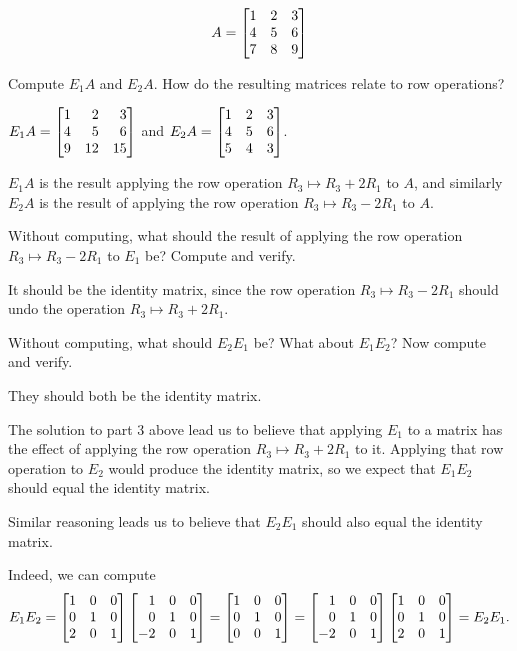 \documentclass{workbook}
\begin{document}
\begin{slide}

	\[
		A=\mat{1&2&3\\4&5&6\\7&8&9}
	\]
	\begin{parts}[resume]
		\item Compute $E_1A$ and $E_2A$. How do the resulting matrices relate to row
		operations?
			\begin{solution}
				$E_1A=\mat{1&2&3\\4&5&6\\9&12&15}$ and $E_2A=\mat{1&2&3\\4&5&6\\5&4&3}$.

				$E_1A$ is the result applying the row operation $R_3\mapsto R_3+2R_1$
				to $A$, and similarly $E_2A$ is the result of applying the row
				operation $R_3\mapsto R_3-2R_1$ to $A$.
			\end{solution}
		\item Without computing, what should the result of applying the row
		operation $R_3\mapsto R_3-2R_1$ to $E_1$ be? Compute and verify.
			\begin{solution}
				It should be the identity matrix, since the row operation
				$R_3\mapsto R_3-2R_1$ should undo the operation $R_3\mapsto R_3+2R_1$.
			\end{solution}
		\item Without computing, what should $E_2E_1$ be? What about $E_1E_2$?
		Now compute and verify.
			\begin{solution}
				They should both be the identity matrix.

				The solution to part 3 above lead us to believe that applying $E_1$
				to a matrix has the effect of applying the row operation $R_3\mapsto R_3+2R_1$
				to it. Applying that row operation to $E_2$ would produce the
				identity matrix, so we expect that $E_1E_2$ should equal the
				identity matrix.

				Similar reasoning leads us to believe that $E_2E_1$ should also
				equal the identity matrix.

				Indeed, we can compute
				\[
					E_1E_2
					=\mat{1&0&0\\0&1&0\\2&0&1}\mat{1&0&0\\0&1&0\\-2&0&1}
					=\mat{1&0&0\\0&1&0\\0&0&1}
					=\mat{1&0&0\\0&1&0\\-2&0&1}\mat{1&0&0\\0&1&0\\2&0&1}
					=E_2E_1.
				\]
			\end{solution}
	\end{parts}
\end{slide}
\end{document}
